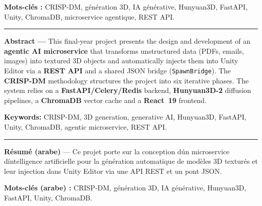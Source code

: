 \documentclass[12pt,a4paper,oneside]{report}
\begin{document}
\medskip\noindent
\textbf{Mots-clés :} CRISP-DM, génération 3D, IA générative, Hunyuan3D,
FastAPI, Unity, ChromaDB, microservice agentique, REST API.

\vspace{0.6cm}\rule{\linewidth}{0.4pt}\vspace{0.4cm}

\noindent\textbf{Abstract ---} This final-year project presents the design
and development of an \textbf{agentic AI microservice} that transforms
unstructured data (PDFs, emails, images) into textured 3D objects and
automatically injects them into Unity Editor via a \textbf{REST API} and a shared JSON bridge (\texttt{SpawnBridge}). The \textbf{CRISP-DM} methodology structures the project
into six iterative phases. The system relies on a
\textbf{FastAPI/Celery/Redis} backend, \textbf{Hunyuan3D-2} diffusion
pipelines, a \textbf{ChromaDB} vector cache and a \textbf{React~19}
frontend.

\medskip\noindent
\textbf{Keywords:} CRISP-DM, 3D generation, generative AI, Hunyuan3D,
FastAPI, Unity, ChromaDB, agentic microservice, REST API.

\vspace{0.6cm}\rule{\linewidth}{0.4pt}\vspace{0.4cm}

\noindent\textbf{R\'esum\'e (arabe)} ---
Ce projet porte sur la conception d\'un microservice d\'intelligence
artificielle pour la g\'en\'eration automatique de mod\`eles 3D textur\'es
et leur injection dans Unity Editor via une API REST et un pont JSON.

\medskip\noindent
\textbf{Mots-cl\'es (arabe) :} CRISP-DM, g\'en\'eration 3D, IA g\'en\'erative,
Hunyuan3D, FastAPI, Unity, ChromaDB.
\cleardoublepage\tableofcontents
\cleardoublepage\listoffigures
{}
\cleardoublepage\listoftables
{}

\cleardoublepage
\end{document}

